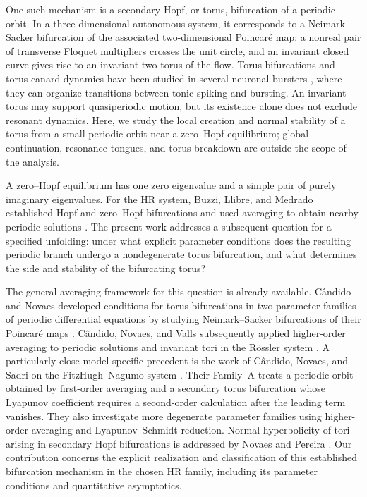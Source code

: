 \documentclass[11pt]{amsart}
\theoremstyle{remark}
\begin{document}
One such mechanism is a secondary Hopf, or torus, bifurcation of a periodic
orbit. In a three-dimensional autonomous system, it corresponds to a
Neimark--Sacker bifurcation of the associated two-dimensional Poincar\'e
map: a nonreal pair of transverse Floquet multipliers crosses the unit
circle, and an invariant closed curve gives rise to an invariant two-torus
of the flow. Torus bifurcations and torus-canard dynamics have been studied
in several neuronal bursters
\cite{BurkeDesrochesBarryKaperKramer2012,JuNeimanShilnikov2018}, where they
can organize transitions between tonic spiking and bursting. An invariant
torus may support quasiperiodic motion, but its existence alone does not
exclude resonant dynamics. Here, we study the local creation and normal
stability of a torus from a small periodic orbit near a zero--Hopf
equilibrium; global continuation, resonance tongues, and torus breakdown
are outside the scope of the analysis.

A zero--Hopf equilibrium has one zero eigenvalue and a simple pair of
purely imaginary eigenvalues. For the HR system, Buzzi, Llibre, and
Medrado established Hopf and zero--Hopf bifurcations and used averaging
to obtain nearby periodic solutions \cite{BuzziLlibreMedrado2016}.
The present work addresses a subsequent question for a specified
unfolding: under what explicit parameter conditions does the resulting
periodic branch undergo a nondegenerate torus bifurcation, and what
determines the side and stability of the bifurcating torus?

The general averaging framework for this question is already available.
C\^{a}ndido and Novaes developed conditions for torus bifurcations in
two-parameter families of periodic differential equations by studying
Neimark--Sacker bifurcations of their Poincar\'e maps
\cite{candido2020torus}. C\^{a}ndido, Novaes, and Valls subsequently
applied higher-order averaging to periodic solutions and invariant tori
in the R\"{o}ssler system \cite{candido2020periodic}.
A particularly close model-specific precedent is the work of
C\^{a}ndido, Novaes, and Sadri on the FitzHugh--Nagumo system
\cite{candido2027invariant}. Their Family~A treats a periodic orbit
obtained by first-order averaging and a secondary torus bifurcation
whose Lyapunov coefficient requires a second-order calculation after
the leading term vanishes. They also investigate more degenerate
parameter families using higher-order averaging and Lyapunov--Schmidt
reduction. Normal hyperbolicity of tori arising in secondary Hopf
bifurcations is addressed by Novaes and Pereira
\cite{novaes2026normal}. Our contribution concerns the explicit
realization and classification of this established bifurcation
mechanism in the chosen HR family, including its parameter conditions
and quantitative asymptotics.
\end{document}

